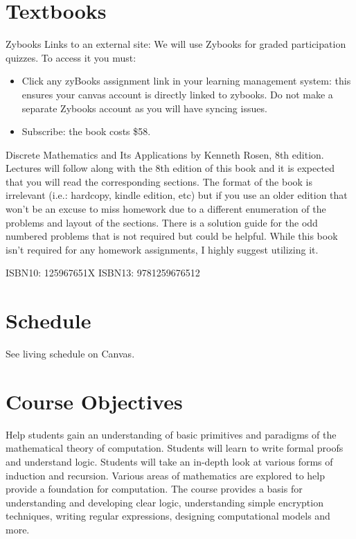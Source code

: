 \documentclass{article}
\begin{document}
\section{Textbooks}
Zybooks Links to an external site: We will use Zybooks for graded participation quizzes. To access it you must:
\begin{itemize}
    \item Click any zyBooks assignment link in your learning management system: this ensures your canvas account is directly linked to zybooks.  Do not make a separate Zybooks account as you will have syncing issues.
    
    \item Subscribe: the book costs \$58.
\end{itemize}
 

Discrete Mathematics and Its Applications by Kenneth Rosen, 8th edition. Lectures will follow along with the 8th edition of this book and it is expected that you will read the corresponding sections.  The format of the book is irrelevant (i.e.: hardcopy, kindle edition, etc) but if you use an older edition that won’t be an excuse to miss homework due to a different enumeration of the problems and layout of the sections. There is a solution guide for the odd numbered problems that is not required but could be helpful.  While this book isn't required for any homework assignments, I highly suggest utilizing it.

ISBN10: 125967651X
ISBN13: 9781259676512

\section{Schedule}
See living schedule on Canvas.

\section{Course Objectives}

Help students gain an understanding of basic primitives and paradigms of the mathematical theory of computation.
Students will learn to write formal proofs and understand logic. Students will take an in-depth look at various forms
of induction and recursion. Various areas of mathematics are explored to help provide a foundation for computation.
The course provides a basis for understanding and developing clear logic, understanding simple encryption
techniques, writing regular expressions, designing computational models and more.
\end{document}
